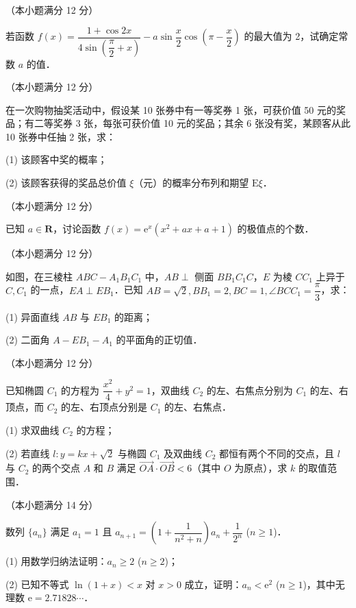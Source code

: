 \begin{question}
（本小题满分 12 分）

若函数 $f(x) = \dfrac{1 + \cos 2x}{4\sin\left(\dfrac{\pi}{2} + x\right)} - a \sin\dfrac{x}{2} \cos\left(\pi - \dfrac{x}{2}\right)$ 的最大值为 2，试确定常数 $a$ 的值．

\end{question}
\begin{question}
（本小题满分 12 分）

在一次购物抽奖活动中，假设某 10 张券中有一等奖券 1 张，可获价值 50 元的奖品；有二等奖券 3 张，每张可获价值 10 元的奖品；其余 6 张没有奖，某顾客从此 10 张券中任抽 2 张，求：

(1) 该顾客中奖的概率；

(2) 该顾客获得的奖品总价值 $\xi$（元）的概率分布列和期望 $\mathrm{E}\xi$．

\end{question}
\begin{question}
（本小题满分 12 分）

已知 $a \in \mathbf{R}$，讨论函数 $f(x) = \mathrm{e}^x(x^2 + ax + a + 1)$ 的极值点的个数．

\Needspace{0.4\textheight}
\end{question}
\begin{question}
（本小题满分 12 分）

如图，在三棱柱 $ABC - A_1B_1C_1$ 中，$AB \perp$ 侧面 $BB_1C_1C$，$E$ 为棱 $CC_1$ 上异于 $C, C_1$ 的一点，$EA \perp EB_1$．已知 $AB = \sqrt{2}, BB_1 = 2, BC = 1, \angle BCC_1 = \dfrac{\pi}{3}$，求：

(1) 异面直线 $AB$ 与 $EB_1$ 的距离；

(2) 二面角 $A - EB_1 - A_1$ 的平面角的正切值．
\nopagebreak[4]
\begin{center}\end{center}
\nopagebreak[4]
\end{question}
\begin{question}
（本小题满分 12 分）

已知椭圆 $C_1$ 的方程为 $\dfrac{x^2}{4} + y^2 = 1$，双曲线 $C_2$ 的左、右焦点分别为 $C_1$ 的左、右顶点，而 $C_2$ 的左、右顶点分别是 $C_1$ 的左、右焦点．

(1) 求双曲线 $C_2$ 的方程；

(2) 若直线 $l: y = kx + \sqrt{2}$ 与椭圆 $C_1$ 及双曲线 $C_2$ 都恒有两个不同的交点，且 $l$ 与 $C_2$ 的两个交点 $A$ 和 $B$ 满足 $\overrightarrow{OA} \cdot \overrightarrow{OB} < 6$（其中 $O$ 为原点），求 $k$ 的取值范围．

\end{question}
\begin{question}
（本小题满分 14 分）

数列 $\{a_n\}$ 满足 $a_1 = 1$ 且 $a_{n+1} = \left(1 + \dfrac{1}{n^2 + n}\right) a_n + \dfrac{1}{2^n}$ ($n \geqslant 1$)．

(1) 用数学归纳法证明：$a_n \geqslant 2$ ($n \geqslant 2$)；

(2) 已知不等式 $\ln(1 + x) < x$ 对 $x > 0$ 成立，证明：$a_n < \mathrm{e}^2$ ($n \geqslant 1$)，其中无理数 $\mathrm{e} = 2.71828\cdots$．

\end{question}